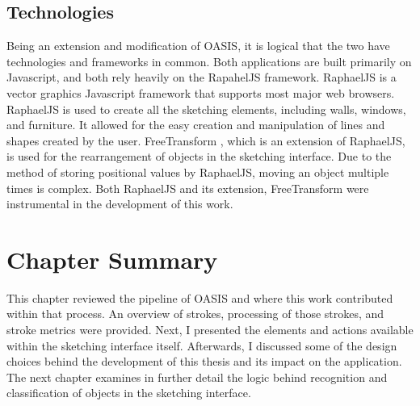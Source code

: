 \subsection{Technologies}

Being an extension and modification of OASIS, it is logical that the two have technologies and frameworks in common. Both applications are built primarily on Javascript, and both rely heavily on the RapahelJS \cite{raphaeljs} framework. RaphaelJS is a vector graphics Javascript framework that supports most major web browsers. RaphaelJS is used to create all the sketching elements, including walls, windows, and furniture. It allowed for the easy creation and manipulation of lines and shapes created by the user. FreeTransform \cite{freetransform}, which is an extension of RaphaelJS, is used for the rearrangement of objects in the sketching interface. Due to the method of storing positional values by RaphaelJS, moving an object multiple times is complex. Both RaphaelJS and its extension, FreeTransform were instrumental in the development of this work.


\section{Chapter Summary}

This chapter reviewed the pipeline of OASIS and where  this work contributed within that process. An overview of strokes, processing of those strokes, and stroke metrics were provided. Next, I presented the elements and actions available within the sketching interface itself. Afterwards, I discussed some of the design choices behind the development of this thesis and its impact on the application. The next chapter examines in further detail the logic behind recognition and classification of objects in the sketching interface.